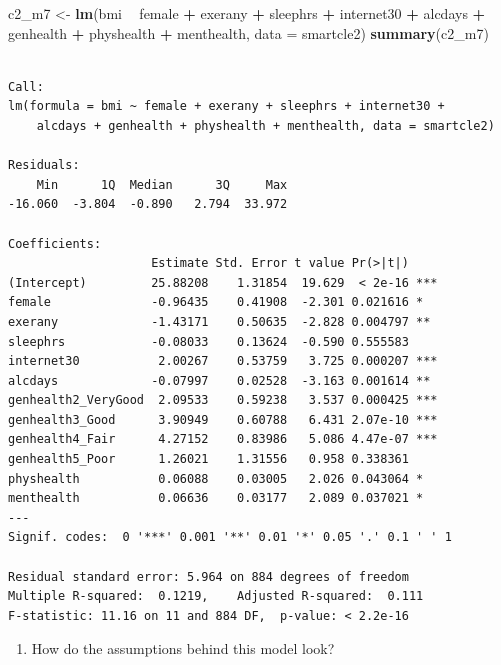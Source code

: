 \documentclass[]{book}
\newenvironment{Shaded}{\begin{snugshade}}{\end{snugshade}}
\newcommand{\KeywordTok}[1]{\textcolor[rgb]{0.13,0.29,0.53}{\textbf{#1}}}
\newcommand{\DataTypeTok}[1]{\textcolor[rgb]{0.13,0.29,0.53}{#1}}
\newcommand{\StringTok}[1]{\textcolor[rgb]{0.31,0.60,0.02}{#1}}
\newcommand{\OperatorTok}[1]{\textcolor[rgb]{0.81,0.36,0.00}{\textbf{#1}}}
\newcommand{\NormalTok}[1]{#1}
\providecommand{\tightlist}{%
  \setlength{\itemsep}{0pt}\setlength{\parskip}{0pt}}
\theoremstyle{definition}
\theoremstyle{definition}
\theoremstyle{definition}
\theoremstyle{remark}
\begin{document}
\begin{Shaded}
\begin{Highlighting}[]
\NormalTok{c2_m7 <-}\StringTok{ }\KeywordTok{lm}\NormalTok{(bmi }\OperatorTok{~}\StringTok{ }\NormalTok{female }\OperatorTok{+}\StringTok{ }\NormalTok{exerany }\OperatorTok{+}\StringTok{ }\NormalTok{sleephrs }\OperatorTok{+}\StringTok{ }\NormalTok{internet30 }\OperatorTok{+}\StringTok{ }\NormalTok{alcdays }\OperatorTok{+}\StringTok{ }
\StringTok{                }\NormalTok{genhealth }\OperatorTok{+}\StringTok{ }\NormalTok{physhealth }\OperatorTok{+}\StringTok{ }\NormalTok{menthealth,}
         \DataTypeTok{data =}\NormalTok{ smartcle2)}
\KeywordTok{summary}\NormalTok{(c2_m7)}
\end{Highlighting}
\end{Shaded}

\begin{verbatim}

Call:
lm(formula = bmi ~ female + exerany + sleephrs + internet30 + 
    alcdays + genhealth + physhealth + menthealth, data = smartcle2)

Residuals:
    Min      1Q  Median      3Q     Max 
-16.060  -3.804  -0.890   2.794  33.972 

Coefficients:
                    Estimate Std. Error t value Pr(>|t|)    
(Intercept)         25.88208    1.31854  19.629  < 2e-16 ***
female              -0.96435    0.41908  -2.301 0.021616 *  
exerany             -1.43171    0.50635  -2.828 0.004797 ** 
sleephrs            -0.08033    0.13624  -0.590 0.555583    
internet30           2.00267    0.53759   3.725 0.000207 ***
alcdays             -0.07997    0.02528  -3.163 0.001614 ** 
genhealth2_VeryGood  2.09533    0.59238   3.537 0.000425 ***
genhealth3_Good      3.90949    0.60788   6.431 2.07e-10 ***
genhealth4_Fair      4.27152    0.83986   5.086 4.47e-07 ***
genhealth5_Poor      1.26021    1.31556   0.958 0.338361    
physhealth           0.06088    0.03005   2.026 0.043064 *  
menthealth           0.06636    0.03177   2.089 0.037021 *  
---
Signif. codes:  0 '***' 0.001 '**' 0.01 '*' 0.05 '.' 0.1 ' ' 1

Residual standard error: 5.964 on 884 degrees of freedom
Multiple R-squared:  0.1219,    Adjusted R-squared:  0.111 
F-statistic: 11.16 on 11 and 884 DF,  p-value: < 2.2e-16
\end{verbatim}

\begin{enumerate}
\def\labelenumi{\arabic{enumi}.}
\tightlist
\item
  How do the assumptions behind this model look?
\end{enumerate}
\end{document}
